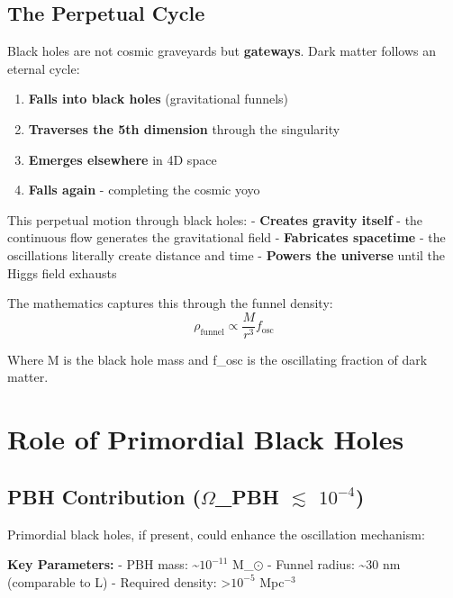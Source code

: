 \documentclass[
  11pt,
]{report}
\providecommand{\tightlist}{%
  \setlength{\itemsep}{0pt}\setlength{\parskip}{0pt}}
\begin{document}
\subsection{The Perpetual Cycle}\label{the-perpetual-cycle}

Black holes are not cosmic graveyards but \textbf{gateways}. Dark matter
follows an eternal cycle:

\begin{enumerate}
\def\labelenumi{\arabic{enumi}.}
\tightlist
\item
  \textbf{Falls into black holes} (gravitational funnels)
\item
  \textbf{Traverses the 5th dimension} through the singularity
\item
  \textbf{Emerges elsewhere} in 4D space\\
\item
  \textbf{Falls again} - completing the cosmic yoyo
\end{enumerate}

This perpetual motion through black holes: - \textbf{Creates gravity
itself} - the continuous flow generates the gravitational field -
\textbf{Fabricates spacetime} - the oscillations literally create
distance and time - \textbf{Powers the universe} until the Higgs field
exhausts

The mathematics captures this through the funnel density:
\[\rho_{\text{funnel}} \propto \frac{M}{r^3} f_{\text{osc}}\]

Where M is the black hole mass and f\_osc is the oscillating fraction of
dark matter.

\section{Role of Primordial Black
Holes}\label{role-of-primordial-black-holes}

\subsection{\texorpdfstring{PBH Contribution (\(\Omega\)\_PBH
\(\lesssim\)
\(10^{-4}\))}{PBH Contribution (\textbackslash Omega\_PBH \textbackslash lesssim 10\^{}\{-4\})}}\label{pbh-contribution-omega_pbh-lesssim-10-4}

Primordial black holes, if present, could enhance the oscillation
mechanism:

\textbf{Key Parameters:} - PBH mass: \textasciitilde{}\(10^{-11}\)
M\_\(\odot\) - Funnel radius: \textasciitilde30 nm (comparable to L) -
Required density: \textgreater{}\(10^{-5}\) Mpc\(^{-3}\)
\end{document}
